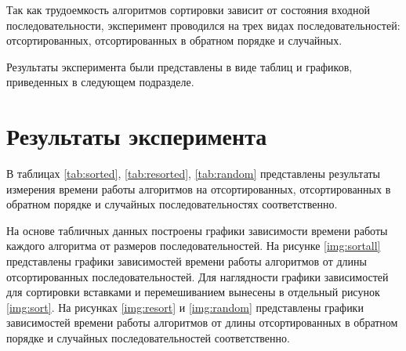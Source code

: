 Так как трудоемкость алгоритмов сортировки зависит от состояния входной
последовательности, эксперимент проводился на трех видах последовательностей:
отсортированных, отсортированных в обратном порядке и случайных.

Результаты эксперимента были представлены в виде таблиц и графиков, приведенных
в следующем подразделе.

\section{Результаты эксперимента}

В таблицах \ref{tab:sorted}, \ref{tab:resorted}, \ref{tab:random} представлены
результаты измерения времени работы алгоритмов на отсортированных,
отсортированных в обратном порядке и случайных последовательностях
соответственно.

На основе табличных данных построены графики зависимости времени работы каждого
алгоритма от размеров последовательностей. На рисунке \ref{img:sortall}
представлены графики зависимостей времени работы алгоритмов от длины
отсортированных последовательностей. Для наглядности графики зависимостей для
сортировки вставками и перемешиванием вынесены в отдельный рисунок
\ref{img:sort}. На рисунках \ref{img:resort} и \ref{img:random} представлены
графики зависимостей времени работы алгоритмов от длины отсортированных в
обратном порядке и случайных последовательностей соответственно.








